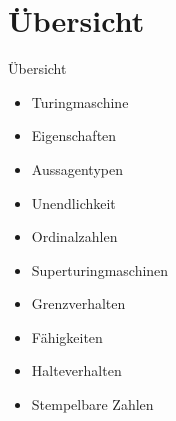 

\section{Übersicht}

\begin{frame}[c]{Übersicht}
    \begin{itemize}
        \item Turingmaschine
        \item Eigenschaften
        \item Aussagentypen
            \pause
        \item Unendlichkeit
        \item Ordinalzahlen
            \pause
        \item Superturingmaschinen
        \item Grenzverhalten
        \item Fähigkeiten
            \pause
        \item Halteverhalten
        \item Stempelbare Zahlen
    \end{itemize}
\end{frame}


